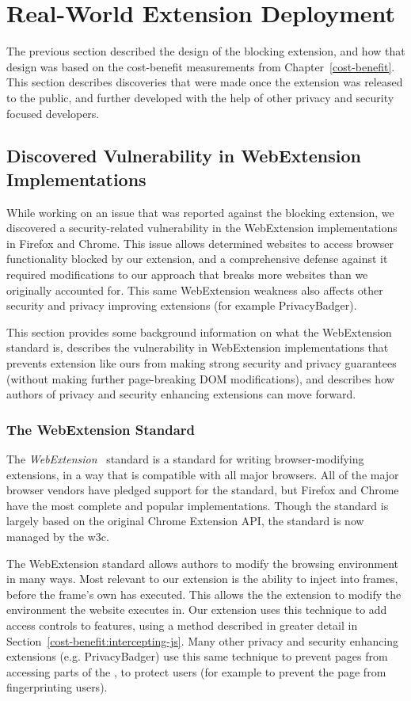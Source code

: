 \section{Real-World Extension Deployment}
\label{current-web:extension-deployment}
The previous section described the design of the \WAPI blocking extension, and
how that design was based on the cost-benefit measurements from
Chapter~\ref{cost-benefit}.  This section describes discoveries that were
made once the extension was released to the public, and further
developed with the help of other privacy and security focused developers.


\subsection{Discovered Vulnerability in WebExtension Implementations}
While working on an issue that was reported against the blocking extension, we
discovered a security-related vulnerability in the WebExtension implementations
in Firefox and Chrome.  This issue allows determined websites to access browser
functionality blocked by our extension, and a comprehensive defense against it
required modifications to our approach that breaks more websites than we
originally accounted for.  This same WebExtension weakness also affects other
security and privacy improving extensions (for example PrivacyBadger).

This section provides some background information on what the WebExtension
standard is, describes the vulnerability in WebExtension implementations that
prevents extension like ours from making strong security and privacy guarantees
(without making further page-breaking DOM modifications), and describes how
authors of privacy and security enhancing extensions can move forward.


\subsubsection{The WebExtension Standard}
The \textit{WebExtension}~\cite{webext2018standard} standard is a standard
for writing browser-modifying extensions, in a way that is compatible
with all major browsers.  All of the major browser vendors have pledged
support for the standard, but Firefox and Chrome have the most complete
and popular implementations.  Though the standard is largely based on
the original Chrome Extension API, the standard is now managed by the \gls{w3c}.

The WebExtension standard allows authors to modify the browsing environment
in many ways.  Most relevant to our extension is the ability to inject
\JS into frames, before the frame's own \JS has executed.  This allows the
the extension to modify the environment the website executes in.  Our extension
uses this technique to add access controls to \WAPI features, using a method
described in greater detail in Section~\ref{cost-benefit:intercepting-js}.
Many other privacy and security enhancing extensions (e.g. PrivacyBadger) use
this same technique to prevent pages from accessing parts of the \WAPI, to
protect users (for example to prevent the page from fingerprinting users).


